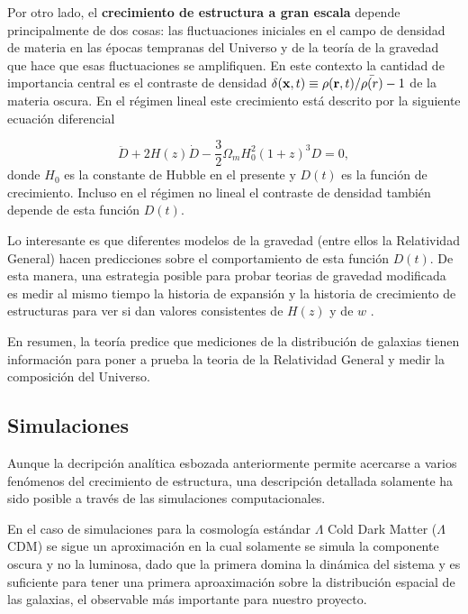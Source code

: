 Por otro lado, el {\bf crecimiento de estructura a gran escala} depende
principalmente de dos cosas: las fluctuaciones iniciales en el campo de densidad
de materia en las \'epocas tempranas del Universo y de la teor\'ia de
la gravedad que hace que esas fluctuaciones se amplifiquen.
En este contexto la cantidad de importancia central es el contraste de
densidad $\delta({\bf  x},t)\equiv\rho({\bf r},t)/\bar{\rho(r)}-1$ de
la materia oscura. 
En el r\'egimen lineal este crecimiento está descrito 
por la siguiente ecuaci\'on diferencial 

\begin{equation}
\ddot{D} + 2H(z)\dot{D}- \frac{3}{2}\Omega_mH_{0}^2(1+z)^3D=0,
\end{equation}
%
donde $H_0$ es la constante de Hubble en el presente y $D(t)$ es la
funci\'on de crecimiento. Incluso en el r\'egimen no lineal el
contraste de densidad tambi\'en depende de esta funci\'on $D(t)$.  

Lo interesante es que diferentes modelos de la gravedad
(entre ellos la Relatividad General) hacen predicciones sobre el
comportamiento de esta funci\'on $D(t)$. 
De esta manera, una estrategia posible para probar teorias de gravedad
modificada es medir al mismo tiempo la historia de expansi\'on y la
historia de crecimiento de estructuras para ver si dan valores
consistentes de $H(z)$ y de $w$ \cite{2014arXiv1401.0046M}.  

En resumen, la teor\'ia predice que mediciones de la distribuci\'on de
galaxias tienen informaci\'on para poner a prueba la teoria de la
Relatividad General y medir la composici\'on del Universo.

\subsection{Simulaciones}

Aunque la decripci\'on anal\'itica esbozada anteriormente
permite acercarse a varios fen\'omenos del crecimiento de estructura,
una descripci\'on detallada solamente ha sido posible a trav\'es de
las simulaciones computacionales. 


En el caso de simulaciones para la cosmolog\'ia est\'andar $\Lambda$
Cold Dark Matter ($\Lambda$CDM) se sigue un aproximaci\'on en la cual
solamente se simula la componente oscura y no la luminosa, dado que
la primera domina la din\'amica del sistema y es suficiente para tener
una primera aproaximación sobre la distribución espacial de las
galaxias, el observable más importante para nuestro proyecto.

